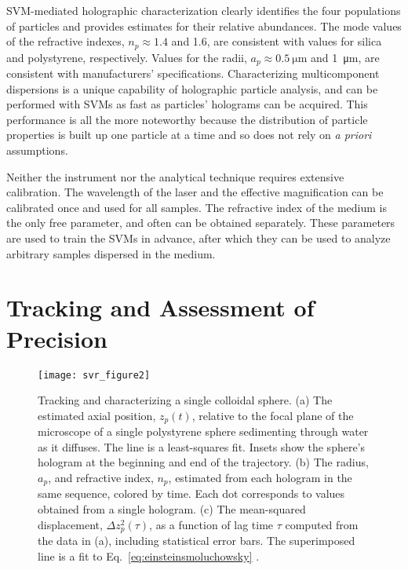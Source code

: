 SVM-mediated holographic characterization clearly identifies
the four populations of particles and provides estimates for their relative abundances.
The mode values of the refractive indexes, $n_p \approx \num{1.4}$ 
and \num{1.6}, are consistent with values for silica and polystyrene,
respectively.  Values for the radii, $a_p \approx \SI{0.5}{\um}$
and \SI{1}{\um}, are consistent with manufacturers'
specifications.
Characterizing multicomponent dispersions
is a unique capability of holographic particle analysis, and
can be performed with SVMs as fast as 
particles' holograms can be acquired.
This performance is all the more noteworthy because the
distribution of particle properties is built up one particle at a time
and so does not rely on \emph{a priori} assumptions.

Neither the instrument nor the analytical technique requires
extensive calibration.
The wavelength of the laser and the effective magnification can be
calibrated once and used for all samples.
The refractive index of the medium is the only free parameter, 
and often can be obtained separately.
These parameters are used to train the SVMs in advance,
after which they can be used to analyze arbitrary samples
dispersed in the medium.

\section{Tracking and Assessment of Precision}

\begin{figure}
  \centering
  \texttt{[image: svr\_figure2]}
  \caption{Tracking and characterizing a single colloidal sphere.
    (a) The estimated axial position, $z_p(t)$, relative to the focal plane
    of the microscope of a single polystyrene sphere sedimenting
    through water as it diffuses.  The line is a least-squares fit.
    Insets show the sphere's hologram at the beginning and end
    of the trajectory.
    (b) The radius, $a_p$, and refractive index, $n_p$,
    estimated from each hologram in the same sequence, colored
    by time.  Each dot corresponds to values obtained from a single
    hologram.
    (c) The mean-squared displacement, $\Delta z_p^2(\tau)$, as a function
    of lag time $\tau$ computed from the data in (a), including
    statistical error bars.  The superimposed line is a fit to
    Eq.~\eqref{eq:einsteinsmoluchowsky} \cite{yevick14}.}
  \label{fig:values}
\end{figure}

